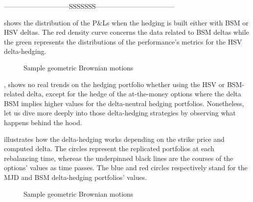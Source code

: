 \documentclass[12pt]{report}
\begin{document}
-----------------------------SSSSSSS-----------------------------------





 shows the distribution of the P\&Ls when the hedging is built either with BSM or HSV deltas. The red density curve concerns the data related to BSM deltas while the green represents the distributions of the performance's metrics for the HSV delta-hedging.

\begin{figure}[h]
  \centering
  
  \caption{Sample geometric Brownian motions}
  \label{p:analysis:hsv:pl:dist:deltas}
\end{figure}

, shows no real trends on the hedging portfolio whether using the HSV or BSM-related delta, except for the hedge of the at-the-money options where the delta BSM implies higher values for the delta-neutral hedging portfolios.
Nonetheless, let us dive more deeply into those delta-hedging strategies by observing what happens behind the hood.

 illustrates how the delta-hedging works depending on the strike price and computed delta.
The circles represent the replicated portfolios at each rebalancing time, whereas the underpinned black lines are the courses of the options' values as time passes.
The blue and red circles respectively stand for the MJD and BSM delta-hedging portfolios' values.
% 
\begin{figure}[h]
  \centering
  
  \caption{Sample geometric Brownian motions}
  \label{p:analysis:hsv:hedge:deltas}
\end{figure}
\end{document}
